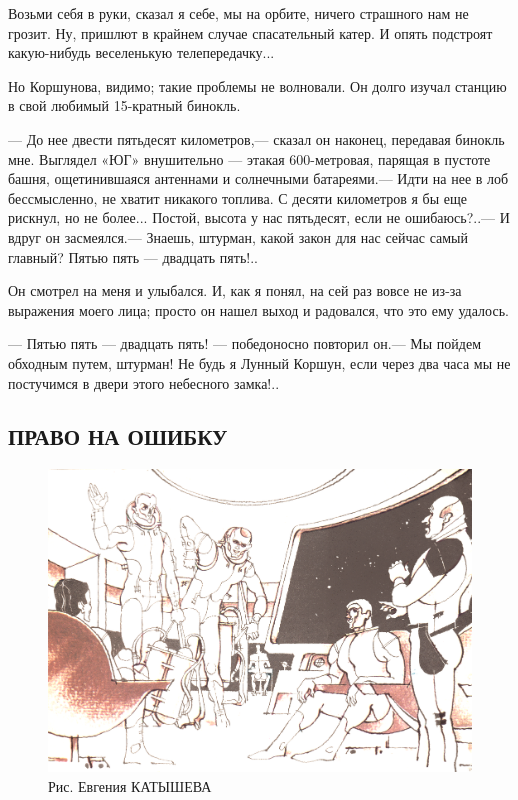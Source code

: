 \documentclass[11pt,a4paper,oneside]{article}
\begin{document}
Возьми себя в руки, сказал я себе, мы на орбите, ничего страшного нам не грозит. Ну, пришлют в крайнем случае спасательный катер. И опять подстроят какую-нибудь веселенькую телепередачку...

Но Коршунова, видимо; такие проблемы не волновали. Он долго изучал станцию в свой любимый 15-кратный бинокль.

— До нее двести пятьдесят километров,— сказал он наконец, передавая бинокль мне. Выглядел «ЮГ» внушительно — этакая 600-метровая, парящая в пустоте башня, ощетинившаяся антеннами и солнечными батареями.— Идти на нее в лоб бессмысленно, не хватит никакого топлива. С десяти километров я бы еще рискнул, но не более... Постой, высота у нас пятьдесят, если не ошибаюсь?..— И вдруг он засмеялся.— Знаешь, штурман, какой закон для нас сейчас самый главный? Пятью пять — двадцать пять!..

Он смотрел на меня и улыбался. И, как я понял, на сей раз вовсе не из-за выражения моего лица; просто он нашел выход и радовался, что это ему удалось.

— Пятью пять — двадцать пять! — победоносно повторил он.— Мы пойдем обходным путем, штурман! Не будь я Лунный Коршун, если через два часа мы не постучимся в двери этого небесного замка!..

\subsection{ПРАВО НА ОШИБКУ}
\label{right_to_mistake}
\begin{figure}[H]
\includegraphics[width=\textwidth]{right_to_mistake}
\caption{Рис. Евгения КАТЫШЕВА}
\end{figure}
\end{document}
